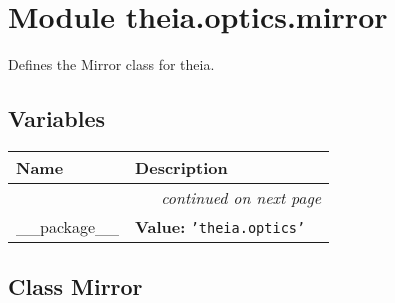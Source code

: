 %
%
%


\section{Module theia.optics.mirror}

    \label{theia:optics:mirror}
Defines the Mirror class for theia.



  \subsection{Variables}

    \vspace{-1cm}
\hspace{\varindent}\begin{longtable}{|p{\varnamewidth}|p{\vardescrwidth}|l}
\cline{1-2}
\cline{1-2} \centering \textbf{Name} & \centering \textbf{Description}& \\
\cline{1-2}
\endhead\cline{1-2}\multicolumn{3}{r}{\small\textit{continued on next page}}\\\endfoot\cline{1-2}
\endlastfoot\raggedright \_\-\_\-p\-a\-c\-k\-a\-g\-e\-\_\-\_\- & \raggedright \textbf{Value:} 
{\tt \texttt{'}\texttt{theia.optics}\texttt{'}}&\\
\cline{1-2}
\end{longtable}



\subsection{Class Mirror}

